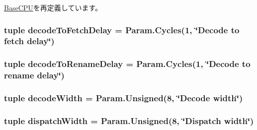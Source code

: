 \hyperlink{classBaseCPU_1_1BaseCPU_a17da7064bc5c518791f0c891eff05fda}{BaseCPU}を再定義しています。\hypertarget{classO3CPU_1_1DerivO3CPU_a9ef9ac64d6891064a22ab5d341e691f4}{
\subsubsection[{decodeToFetchDelay}]{\setlength{\rightskip}{0pt plus 5cm}tuple {\bf decodeToFetchDelay} = Param.Cycles(1, \char`\"{}Decode to fetch delay\char`\"{})}}
\label{classO3CPU_1_1DerivO3CPU_a9ef9ac64d6891064a22ab5d341e691f4}
\hypertarget{classO3CPU_1_1DerivO3CPU_a168896b51e7cc580a9f343e0538ed193}{
\subsubsection[{decodeToRenameDelay}]{\setlength{\rightskip}{0pt plus 5cm}tuple {\bf decodeToRenameDelay} = Param.Cycles(1, \char`\"{}Decode to rename delay\char`\"{})}}
\label{classO3CPU_1_1DerivO3CPU_a168896b51e7cc580a9f343e0538ed193}
\hypertarget{classO3CPU_1_1DerivO3CPU_a52dc575e0588181eb7c3bd1e3d803cfd}{
\subsubsection[{decodeWidth}]{\setlength{\rightskip}{0pt plus 5cm}tuple {\bf decodeWidth} = Param.Unsigned(8, \char`\"{}Decode width\char`\"{})}}
\label{classO3CPU_1_1DerivO3CPU_a52dc575e0588181eb7c3bd1e3d803cfd}
\hypertarget{classO3CPU_1_1DerivO3CPU_ac7d8d81c4bbae7e104c3802f303ad90a}{
\subsubsection[{dispatchWidth}]{\setlength{\rightskip}{0pt plus 5cm}tuple {\bf dispatchWidth} = Param.Unsigned(8, \char`\"{}Dispatch width\char`\"{})}}
